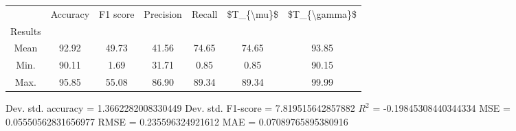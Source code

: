 \begin{tabular}{|c|c|c|c|c|c|c|}
\toprule
{} &  Accuracy &  F1 score &  Precision &  Recall &  \$T\_\{\textbackslash mu\}\$ &  \$T\_\{\textbackslash gamma\}\$ \\
Results &           &           &            &         &            &               \\
\hline
Mean    &     92.92 &     49.73 &      41.56 &   74.65 &      74.65 &         93.85 \\
Min.    &     90.11 &      1.69 &      31.71 &    0.85 &       0.85 &         90.15 \\
Max.    &     95.85 &     55.08 &      86.90 &   89.34 &      89.34 &         99.99 \\
\bottomrule
\end{tabular}

 Dev. std. accuracy = 1.3662282008330449
 Dev. std. F1-score = 7.819515642857882
 $R^2$ = -0.19845308440344334
 MSE = 0.05550562831656977
 RMSE = 0.235596324921612
 MAE = 0.07089765895380916